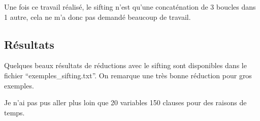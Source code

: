 \documentclass[a4paper,10pt]{article}
\begin{document}
Une fois ce travail réalisé, le sifting n'est qu'une concaténation de 3 boucles dans 1 autre, cela ne m'a donc pas demandé beaucoup de travail.

\subsection{Résultats}
Quelques beaux résultats de réductions avec le sifting sont disponibles dans le fichier ``exemples\_sifting.txt''. On remarque une très bonne réduction pour gros exemples.

Je n'ai pas pus aller plus loin que 20 variables 150 clauses pour des raisons de temps.
\end{document}
